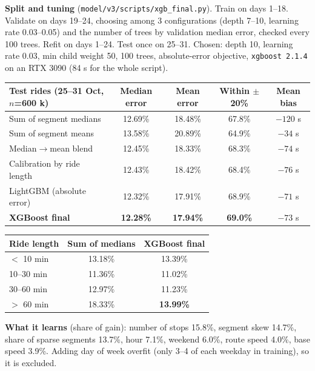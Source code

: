 \documentclass[10.5pt,a4paper]{article}
\begin{document}
\textbf{Split and tuning} (\texttt{model/v3/scripts/xgb\_final.py}). Train on days 1--18. Validate on days 19--24, choosing among 3 configurations (depth 7--10, learning rate 0.03--0.05) and the number of trees by validation median error, checked every 100 trees. Refit on days 1--24. Test once on 25--31. Chosen: depth 10, learning rate 0.03, min child weight 50, 100 trees, absolute-error objective, \texttt{xgboost 2.1.4} on an RTX 3090 (84 s for the whole script).

\begin{center}\small
\begin{tabular}{@{}lcccc@{}}
\toprule
\textbf{Test rides (25--31 Oct, $n$=600 k)} & \textbf{Median error} & \textbf{Mean error} & \textbf{Within $\pm$20\%} & \textbf{Mean bias} \\
\midrule
Sum of segment medians & 12.69\% & 18.48\% & 67.8\% & $-120$ s \\
Sum of segment means & 13.58\% & 20.89\% & 64.9\% & $-34$ s \\
Median$\rightarrow$mean blend & 12.45\% & 18.33\% & 68.3\% & $-74$ s \\
Calibration by ride length & 12.43\% & 18.42\% & 68.4\% & $-76$ s \\
LightGBM (absolute error) & 12.32\% & 17.91\% & 68.9\% & $-71$ s \\
\textbf{XGBoost final} & \textbf{12.28\%} & \textbf{17.94\%} & \textbf{69.0\%} & $-73$ s \\
\bottomrule
\end{tabular}
\hspace{4mm}
\end{center}
\begin{center}\small
\begin{tabular}{@{}lcc@{}}
\toprule
\textbf{Ride length} & \textbf{Sum of medians} & \textbf{XGBoost final} \\
\midrule
$<$ 10 min & 13.18\% & 13.39\% \\
10--30 min & 11.36\% & 11.02\% \\
30--60 min & 12.97\% & 11.23\% \\
$>$ 60 min & 18.33\% & \textbf{13.99\%} \\
\bottomrule
\end{tabular}
\end{center}
\textbf{What it learns} (share of gain): number of stops 15.8\%, segment skew 14.7\%, share of sparse segments 13.7\%, hour 7.1\%, weekend 6.0\%, route speed 4.0\%, base speed 3.9\%. Adding day of week overfit (only 3--4 of each weekday in training), so it is excluded.
\end{document}

